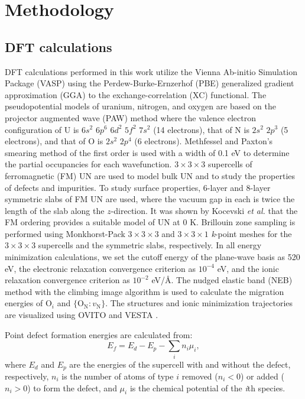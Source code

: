 \documentclass[preprint,12pt,sort&compress]{elsarticle}
\newcommand{\?}{\stackrel{?}{=}}
\begin{document}
\section{Methodology}

\subsection{DFT calculations}

DFT calculations performed in this work utilize the Vienna Ab-initio Simulation Package (VASP) \cite{Kresse1993, Kresse1996a, Kresse1996b} using the Perdew-Burke-Ernzerhof (PBE) \cite{Perdew1996} generalized gradient approximation (GGA) to the exchange-correlation (XC) functional. The pseudopotential models of uranium, nitrogen, and oxygen are based on the projector augmented wave (PAW) method \cite{Kresse1999} where the valence electron configuration of U is $6s^2$ $6p^6$ $6d^2$ $5f^2$ $7s^2$ (14 electrons), that of N is $2s^2$ $2p^3$ (5 electrons), and that of O is $2s^2$ $2p^4$ (6 electrons). Methfessel and Paxton’s smearing method \cite{Methfessel1989} of the first order is used with a width of 0.1 eV to determine the partial occupancies for each wavefunction. $3 \times 3 \times 3$ supercells of ferromagnetic (FM) UN are used to model bulk UN and to study the properties of defects and impurities. To study surface properties, 6-layer and 8-layer symmetric slabs of FM UN are used, where the vacuum gap in each is twice the length of the slab along the $z$-direction. It was shown by Kocevski \textit{et al.} \cite{Kocevski2022I} that the FM ordering provides a suitable model of UN at 0 K. Brillouin zone sampling is performed using Monkhorst-Pack \cite{Monkhorst1976} $3 \times 3 \times 3$ and $3 \times 3 \times 1$ \textit{k}-point meshes for the $3 \times 3 \times 3$ supercells and the symmetric slabs, respectively. In all energy minimization calculations, we set the cutoff energy of the plane-wave basis as 520 eV, the electronic relaxation convergence criterion as $10^{-4}$ eV, and the ionic relaxation convergence criterion as $10^{-2}$ eV/\AA. The nudged elastic band (NEB) method \cite{Henkelman2000a} with the climbing image algorithm \cite{Henkelman2000b} is used to calculate the migration energies of O$_i$ and $\{\text{O}_\text{N} \! : \! v_\text{N}\}$. The structures and ionic minimization trajectories are visualized using OVITO \cite{Stukowski2010} and VESTA \cite{Momma2008}.


Point defect formation energies are calculated from:
\begin{equation}
E_f = E_d - E_p - \sum_i n_i \mu_i,
\end{equation}
where $E_d$ and $E_p$ are the energies of the supercell with and without the defect, respectively, $n_i$ is the number of atoms of type $i$ removed ($n_i < 0$) or added ($n_i > 0$) to form the defect, and $\mu_i$ is the chemical potential of the \textit{i}th species.
\end{document}
